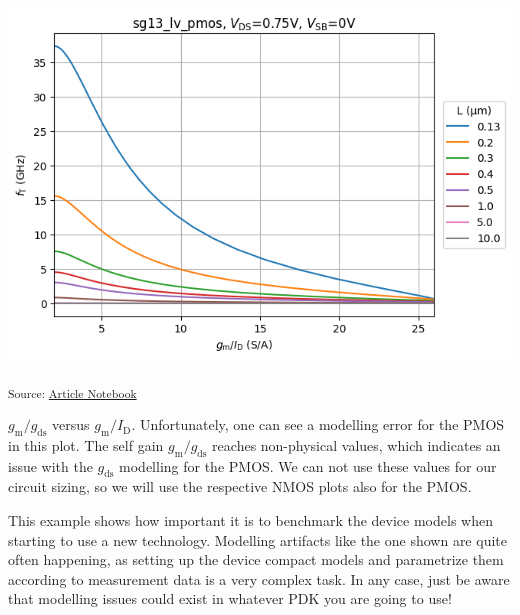 \documentclass[
  a4paper,
  DIV=11,
  numbers=noendperiod]{scrartcl}
\begin{document}
\includegraphics{index_files/figure-latex/.-sizing-techsweep_sg13_plots_pmos-cell-9-output-1.png}

\textsubscript{Source:
\href{https://iic-jku.github.io/analog-circuit-design/index.qmd.html}{Article
Notebook}}

\(g_\mathrm{m}/ g_\mathrm{ds}\) versus \(g_\mathrm{m}/I_\mathrm{D}\).
Unfortunately, one can see a modelling error for the PMOS in this plot.
The self gain \(g_\mathrm{m}/ g_\mathrm{ds}\) reaches non-physical
values, which indicates an issue with the \(g_\mathrm{ds}\) modelling
for the PMOS. We can not use these values for our circuit sizing, so we
will use the respective NMOS plots also for the PMOS.

\begin{tcolorbox}[enhanced jigsaw, titlerule=0mm, left=2mm, coltitle=black, toprule=.15mm, breakable, opacitybacktitle=0.6, colframe=quarto-callout-important-color-frame, bottomtitle=1mm, toptitle=1mm, opacityback=0, colbacktitle=quarto-callout-important-color!10!white, title=\textcolor{quarto-callout-important-color}{\faExclamation}\hspace{0.5em}{Beware of Modelling Issues}, arc=.35mm, rightrule=.15mm, colback=white, bottomrule=.15mm, leftrule=.75mm]

This example shows how important it is to benchmark the device models
when starting to use a new technology. Modelling artifacts like the one
shown are quite often happening, as setting up the device compact models
and parametrize them according to measurement data is a very complex
task. In any case, just be aware that modelling issues could exist in
whatever PDK you are going to use!

\end{tcolorbox}
\end{document}
